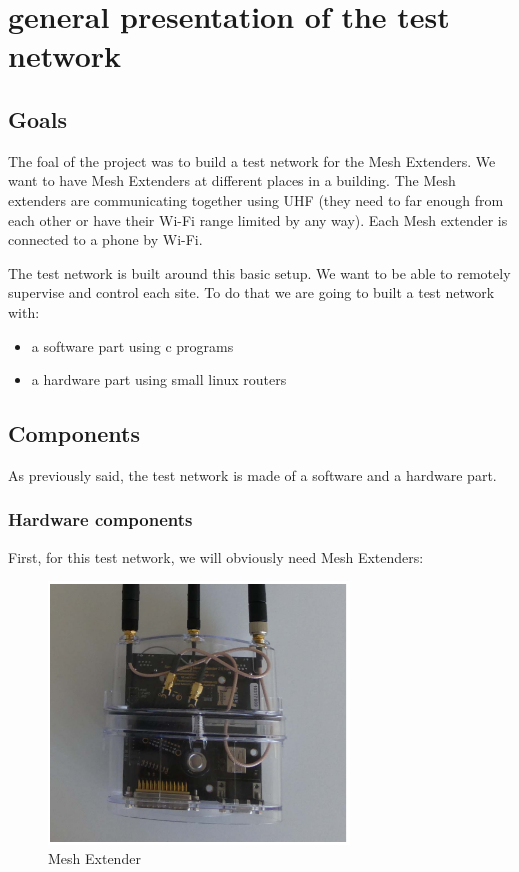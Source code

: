 \chapter{general presentation of the test network}


\section{Goals}

The foal of the project was to build a test network for the Mesh Extenders. 
We want to have Mesh Extenders at different places in a building. The Mesh extenders are communicating together using UHF (they need to far enough from each other or have their Wi-Fi range limited by any way). Each Mesh extender is connected to a phone by Wi-Fi.

The test network is built around this basic setup. We want to be able to remotely supervise and control each site.
To do that we are going to built a test network with:
\begin{itemize}
	\item a software part using c programs
	\item a hardware part using small linux routers
\end{itemize}



\section{Components}

As previously said, the test network is made of a software and a hardware part.

\subsection{Hardware components}

First, for this test network, we will obviously need Mesh Extenders:
\begin{figure}[H]
\begin{center}
\includegraphics[width=8cm]{image/meshextender.png}%
\caption{Mesh Extender}%
\label{figure:ME}%
\end{center}
\end{figure}


